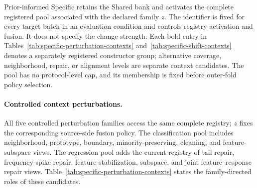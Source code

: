 Prior-informed Specific retains the Shared bank and activates the complete
registered pool associated with the declared family $z$. The identifier is
fixed for every target batch in an evaluation condition and controls registry
activation and fusion. It does not specify the change strength. Each
bold entry in Tables~\ref{tab:specific-perturbation-contexts}
and~\ref{tab:specific-shift-contexts} denotes a separately registered
constructor group; alternative coverage, neighborhood, repair, or alignment
levels are separate context candidates. The pool has no protocol-level cap,
and its membership is fixed before outer-fold policy selection.

\paragraph{Controlled context perturbations.}
All five controlled perturbation families access the same complete registry;
$z$ fixes the corresponding source-side fusion policy. The classification pool
includes neighborhood, prototype, boundary,
minority-preserving, cleaning, and feature-subspace views. The regression pool
adds the current registry of tail repair, frequency-spike repair, feature
stabilization, subspace, and joint feature--response repair views. Table~\ref{tab:specific-perturbation-contexts}
states the family-directed roles of these candidates.

